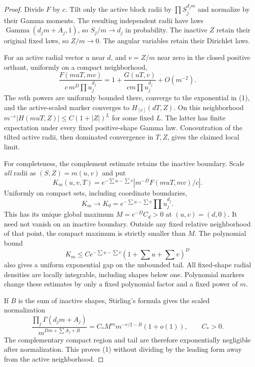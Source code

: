 \documentclass[11pt]{article}
\begin{document}
\begin{proof}
Divide $F$ by $c$. Tilt only the active block radii by
$\prod S_j^{d_jm}$ and normalize by their Gamma moments.
The resulting independent radii have laws
$\operatorname{Gamma}(d_jm+A_j,1)$, so $S_j/m\to d_j$ in probability.
The inactive $Z$ retain their original fixed laws, so $Z/m\to0$.
The angular variables retain their Dirichlet laws.

For an active radial vector $u$ near $d$, and $v=Z/m$ near zero in
the closed positive orthant, uniformly on a compact neighborhood,
\[
 \frac{F(muT,mv)}{c\,m^D\prod u_j^{d_j}}
 =
 1+\frac{G(uT,v)}{cm\prod u_j^{d_j}}+O(m^{-2}).
\]
The $m$th powers are uniformly bounded there, converge to the
exponential in (1), and the active-scaled marker converges to
$H_{[e]}(dT,Z)$. On this neighborhood
$m^{-e}|H(muT,Z)|\le C(1+|Z|)^L$ for some fixed $L$.
The latter has finite expectation under every fixed positive-shape
Gamma law. Concentration of the tilted active radii, then dominated
convergence in $T,Z$, gives the claimed local limit.

For completeness, the complement estimate retains the inactive boundary.
Scale \emph{all} radii as $(S,Z)=m(u,v)$ and put
\[
 K_m(u,v,T)=e^{-\sum u-\sum v}
 |m^{-D}F(muT,mv)/c|.
\]
Uniformly on compact sets, including coordinate boundaries,
\[
 K_m\longrightarrow
 K_0=e^{-\sum u-\sum v}\prod u_j^{d_j}.
\]
This has its unique global maximum $M=e^{-D}C_d>0$ at
$(u,v)=(d,0)$. It need not vanish on an inactive boundary.
Outside any fixed relative neighborhood of that point, the compact
maximum is strictly smaller than $M$. The polynomial bound
\[
 K_m\le C e^{-\sum u-\sum v}(1+\sum u+\sum v)^D
\]
also gives a uniform exponential gap on the unbounded tail.
All fixed-shape radial densities are locally integrable, including
shapes below one. Polynomial markers change these estimates by only
a fixed polynomial factor and a fixed power of $m$.

If $B$ is the sum of inactive shapes, Stirling's formula gives the
scaled normalization
\[
 \frac{\prod_j\Gamma(d_jm+A_j)}
 {m^{Dm+\sum A_j+B}}
 =C_*M^m m^{-r/2-B}(1+o(1)),\qquad C_*>0.
\]
The complementary compact region and tail are therefore exponentially
negligible after normalization. This proves (1) without dividing by
the leading form away from the active neighborhood.
\end{proof}
\end{document}
